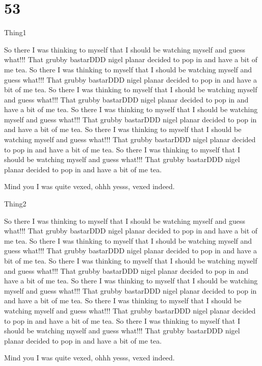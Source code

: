 \chapter{53}

\begin{define}{Thing1} 

So there I was thinking to myself that I should be 
watching myself and guess what!!!
That grubby bastarDDD nigel planar decided to pop in and have a bit of
me tea. 
So there I was thinking to myself that I should be 
watching myself and guess what!!!
That grubby bastarDDD nigel planar decided to pop in and have a bit of
me tea. So there I was thinking to myself that I should be 
watching myself and guess what!!!
That grubby bastarDDD nigel planar decided to pop in and have a bit of
me tea. So there I was thinking to myself that I should be 
watching myself and guess what!!!
That grubby bastarDDD nigel planar decided to pop in and have a bit of
me tea. 
So there I was thinking to myself that I should be 
watching myself and guess what!!!
That grubby bastarDDD nigel planar decided to pop in and have a bit of
me tea. So there I was thinking to myself that I should be 
watching myself and guess what!!!
That grubby bastarDDD nigel planar decided to pop in and have a bit of
me tea. 

Mind you I was quite vexed, ohhh yesss, vexed indeed.   

\end{define}

\begin{define}{Thing2}

So there I was thinking to myself that I should be 
watching myself and guess what!!!
That grubby bastarDDD nigel planar decided to pop in and have a bit of
me tea. 
So there I was thinking to myself that I should be 
watching myself and guess what!!!
That grubby bastarDDD nigel planar decided to pop in and have a bit of
me tea. So there I was thinking to myself that I should be 
watching myself and guess what!!!
That grubby bastarDDD nigel planar decided to pop in and have a bit of
me tea. So there I was thinking to myself that I should be 
watching myself and guess what!!!
That grubby bastarDDD nigel planar decided to pop in and have a bit of
me tea. 
So there I was thinking to myself that I should be 
watching myself and guess what!!!
That grubby bastarDDD nigel planar decided to pop in and have a bit of
me tea. So there I was thinking to myself that I should be 
watching myself and guess what!!!
That grubby bastarDDD nigel planar decided to pop in and have a bit of
me tea. 

Mind you I was quite vexed, ohhh yesss, vexed indeed.   

\end{define}

